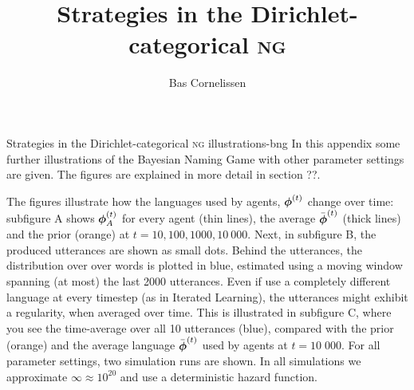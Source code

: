 \documentclass{../src/bcthesispart}
\title{Strategies in the Dirichlet-categorical \textsc{ng}}
\author{Bas Cornelissen}
\begin{document}
%
	{Strategies in the Dirichlet-categorical \textsc{ng}}%
	{illustrations-bng}{%
	In this appendix some further illustrations of the Bayesian Naming Game with other parameter settings are given.
	The figures are explained in more detail in section ??.
	}

	

\noindent
The figures illustrate how the languages used by agents, $\boldsymbol{\mathbf{\phi}}^{(t)}$ 
	change over time: subfigure A shows $\boldsymbol{\mathbf{\phi}}_A^{(t)}$ for every agent (thin lines), the average $\bar{\boldsymbol{\mathbf{\phi}}}^{(t)}$ (thick lines) and the prior (orange) at $t=10,100,1000, 10\ 000$. 
Next, in subfigure B, the produced utterances are shown as small dots.
Behind the utterances, the distribution over over words is plotted in blue, estimated using a moving window spanning (at most) the last 2000 utterances.
Even if use a completely different language at every timestep (as in Iterated Learning), the utterances might exhibit a regularity, when averaged over time.
This is illustrated in subfigure C, where you see the time-average over all 10 utterances (blue), compared with the prior (orange) and the average language $\bar{\boldsymbol{\mathbf{\phi}}}^{(t)}$ used by agents at $t=10\; 000$.
For all parameter settings, two simulation runs are shown.
In all simulations we approximate $\infty \approx 10^{20}$ and use a deterministic hazard function.
\end{document}
